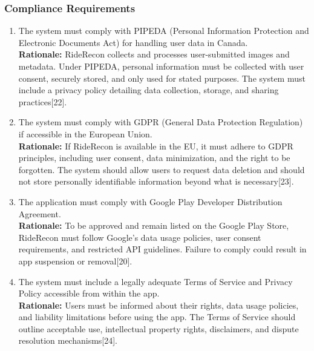 \documentclass[]{article}
\begin{document}
\subsubsection{Compliance Requirements}
\label{ssub:compliance_requirements}
\begin{enumerate}[label={LR-COMP\arabic*.}]
    \item The system must comply with PIPEDA (Personal Information Protection and Electronic Documents Act) for handling user data in Canada.\\
   \textbf{Rationale:} RideRecon collects and processes user-submitted images and metadata. Under PIPEDA, personal information must be collected with user consent, securely stored, and only used for stated purposes. The system must include a privacy policy detailing data collection, storage, and sharing practices[22].
   \item The system must comply with GDPR (General Data Protection Regulation) if accessible in the European Union.\\
   \textbf{Rationale:} If RideRecon is available in the EU, it must adhere to GDPR principles, including user consent, data minimization, and the right to be forgotten. The system should allow users to request data deletion and should not store personally identifiable information beyond what is necessary[23].
   \item The application must comply with Google Play Developer Distribution Agreement.\\
   \textbf{Rationale:} To be approved and remain listed on the Google Play Store, RideRecon must follow Google’s data usage policies, user consent requirements, and restricted API guidelines. Failure to comply could result in app suspension or removal[20].
   \item The system must include a legally adequate Terms of Service and Privacy Policy accessible from within the app.\\
   \textbf{Rationale:} Users must be informed about their rights, data usage policies, and liability limitations before using the app. The Terms of Service should outline acceptable use, intellectual property rights, disclaimers, and dispute resolution mechanisms[24]. 
\end{enumerate}
\end{document}
